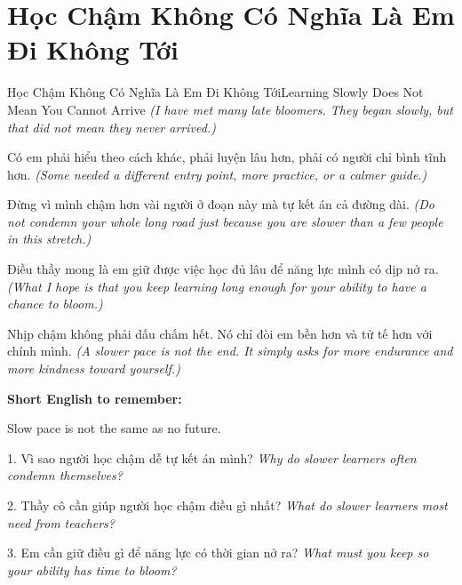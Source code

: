 \section{Học Chậm Không Có Nghĩa Là Em Đi Không Tới}
\begin{truyen}{Học Chậm Không Có Nghĩa Là Em Đi Không Tới}{Learning Slowly Does Not Mean You Cannot Arrive}
\textit{(I have met many late bloomers. They began slowly, but that did not mean they never arrived.)}

Có em phải hiểu theo cách khác, phải luyện lâu hơn, phải có người chỉ bình tĩnh hơn.
\textit{(Some needed a different entry point, more practice, or a calmer guide.)}

Đừng vì mình chậm hơn vài người ở đoạn này mà tự kết án cả đường dài.
\textit{(Do not condemn your whole long road just because you are slower than a few people in this stretch.)}

Điều thầy mong là em giữ được việc học đủ lâu để năng lực mình có dịp nở ra.
\textit{(What I hope is that you keep learning long enough for your ability to have a chance to bloom.)}
\end{truyen}

\begin{baihoc}
Nhịp chậm không phải dấu chấm hết. Nó chỉ đòi em bền hơn và tử tế hơn với chính mình.
\textit{(A slower pace is not the end. It simply asks for more endurance and more kindness toward yourself.)}
\end{baihoc}

\begin{ghinhoanh}
\textbf{Short English to remember:}

Slow pace is not the same as no future.

\end{ghinhoanh}

\begin{tuhocnhanh}
1. Vì sao người học chậm dễ tự kết án mình? \textit{Why do slower learners often condemn themselves?}

2. Thầy cô cần giúp người học chậm điều gì nhất? \textit{What do slower learners most need from teachers?}

3. Em cần giữ điều gì để năng lực có thời gian nở ra? \textit{What must you keep so your ability has time to bloom?}
\end{tuhocnhanh}
\ngancach

